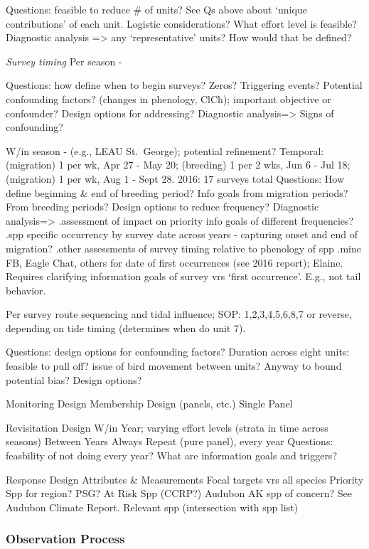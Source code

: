\documentclass[]{article}
\begin{document}
Questions: feasible to reduce \# of units? See Qs above about `unique
contributions' of each unit. Logistic considerations? What effort level
is feasible? Diagnostic analysis =\textgreater{} any `representative'
units? How would that be defined?

\emph{Survey timing} Per season -

Questions: how define when to begin surveys? Zeros? Triggering events?
Potential confounding factors? (changes in phenology, ClCh); important
objective or confounder? Design options for addressing? Diagnostic
analysis=\textgreater{} Signs of confounding?

W/in season - (e.g., LEAU St.~George); potential refinement? Temporal:
(migration) 1 per wk, Apr 27 - May 20; (breeding) 1 per 2 wks, Jun 6 -
Jul 18; (migration) 1 per wk, Aug 1 - Sept 28. 2016: 17 surveys total
Questions: How define beginning \& end of breeding period? Info goals
from migration periods? From breeding periods? Design options to reduce
frequency? Diagnostic analysis=\textgreater{} .assessment of impact on
priority info goals of different frequencies? .spp specific occurrency
by survey date across years - capturing onset and end of migration?
.other assessments of survey timing relative to phenology of spp .mine
FB, Eagle Chat, others for date of first occurrences (see 2016 report);
Elaine. Requires clarifying information goals of survey vrs `first
occurrence'. E.g., not tail behavior.

Per survey route sequencing and tidal influence; SOP: 1,2,3,4,5,6,8,7 or
reverse, depending on tide timing (determines when do unit 7).

Questions: design options for confounding factors? Duration across eight
units: feasible to pull off? issue of bird movement between units?
Anyway to bound potential bias? Design options?

Monitoring Design Membership Design (panels, etc.) Single Panel

Revisitation Design W/in Year; varying effort levels (strata in time
across seasons) Between Years Always Repeat (pure panel), every year
Questions: feasbility of not doing every year? What are information
goals and triggers?

Response Design Attributes \& Measurements Focal targets vrs all species
Priority Spp for region? PSG? At Risk Spp (CCRP?) Audubon AK spp of
concern? See Audubon Climate Report. Relevant spp (intersection with spp
list)

\subsubsection{Observation Process}\label{observation-process}
\end{document}
